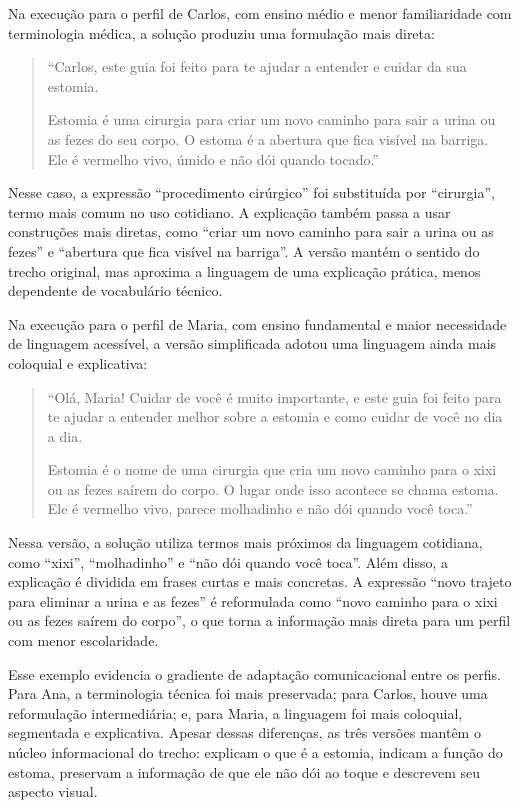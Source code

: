 Na execução para o perfil de Carlos, com ensino médio e menor familiaridade com terminologia médica, a solução produziu uma formulação mais direta:

\begin{quote}
``Carlos, este guia foi feito para te ajudar a entender e cuidar da sua estomia.

Estomia é uma cirurgia para criar um novo caminho para sair a urina ou as fezes do seu corpo. O estoma é a abertura que fica visível na barriga. Ele é vermelho vivo, úmido e não dói quando tocado.''
\end{quote}

Nesse caso, a expressão ``procedimento cirúrgico'' foi substituída por ``cirurgia'', termo mais comum no uso cotidiano. A explicação também passa a usar construções mais diretas, como ``criar um novo caminho para sair a urina ou as fezes'' e ``abertura que fica visível na barriga''. A versão mantém o sentido do trecho original, mas aproxima a linguagem de uma explicação prática, menos dependente de vocabulário técnico.

Na execução para o perfil de Maria, com ensino fundamental e maior necessidade de linguagem acessível, a versão simplificada adotou uma linguagem ainda mais coloquial e explicativa:

\begin{quote}
``Olá, Maria! Cuidar de você é muito importante, e este guia foi feito para te ajudar a entender melhor sobre a estomia e como cuidar de você no dia a dia.

Estomia é o nome de uma cirurgia que cria um novo caminho para o xixi ou as fezes saírem do corpo. O lugar onde isso acontece se chama estoma. Ele é vermelho vivo, parece molhadinho e não dói quando você toca.''
\end{quote}

Nessa versão, a solução utiliza termos mais próximos da linguagem cotidiana, como ``xixi'', ``molhadinho'' e ``não dói quando você toca''. Além disso, a explicação é dividida em frases curtas e mais concretas. A expressão ``novo trajeto para eliminar a urina e as fezes'' é reformulada como ``novo caminho para o xixi ou as fezes saírem do corpo'', o que torna a informação mais direta para um perfil com menor escolaridade.

Esse exemplo evidencia o gradiente de adaptação comunicacional entre os perfis. Para Ana, a terminologia técnica foi mais preservada; para Carlos, houve uma reformulação intermediária; e, para Maria, a linguagem foi mais coloquial, segmentada e explicativa. Apesar dessas diferenças, as três versões mantêm o núcleo informacional do trecho: explicam o que é a estomia, indicam a função do estoma, preservam a informação de que ele não dói ao toque e descrevem seu aspecto visual.

